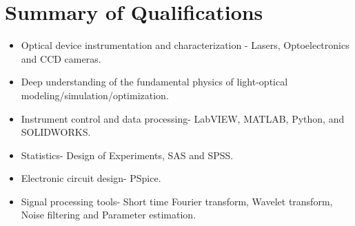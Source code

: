 \documentclass{my_cv}
\begin{document}
\vspace{-2mm}
\begin{center} 
\begin{footnotesize}
\end{footnotesize}

\href{https://www.linkedin.com/in/venkaiahchowdarykavuri}{\textcolor{linkedincolor}{\faLinkedinSquare}} \href{https://github.com/Venki-Kavuri}{\faGithub} \href{https://scholar.google.com/citations?hl=en&user=r5E9ACIAAAAJ&view_op=list_works}{\textcolor{gscholarcolor}{\aiGoogleScholar}} \href{https://www.facebook.com/venki.kavuri}{\textcolor{facebookcolor}{\faFacebookOfficial}}
\end{center} 

\vspace{-9mm} 

\section{Summary of Qualifications}
\begin{itemize}\itemsep 0pt

\item Optical device instrumentation and characterization - Lasers, Optoelectronics and CCD cameras. 
\item Deep understanding of the fundamental physics of light-optical modeling/simulation/optimization.
\item Instrument control and data processing- LabVIEW, MATLAB, Python, and SOLIDWORKS. 
\item Statistics- Design of Experiments, SAS and SPSS.
\item Electronic circuit design- PSpice.
\item Signal processing tools- Short time Fourier transform, Wavelet transform, Noise filtering and Parameter estimation.
\end{itemize}
\vspace{-7mm}


\end{document}
